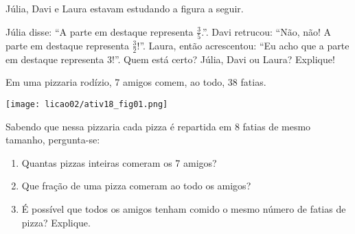 \begin{atividade}{}\label{chap2-ativ18}
\tikzset{x=1mm,y=1mm}

Júlia, Davi e Laura estavam estudando a figura a seguir.
\begin{center}
\end{center}
Júlia disse: ``A parte em destaque representa $\frac{3}{5}$.''. Davi retrucou: ``Não, não! A parte em destaque representa $\frac{3}{2}$!''. Laura, então acrescentou: ``Eu acho que a parte em destaque representa $3$!''. Quem está certo? Júlia, Davi ou Laura? Explique!
\end{atividade}

\begin{atividade}{}\label{chap2-ativ19}

Em uma pizzaria rodízio, 7 amigos comem, ao todo, 38 fatias.

\begin{center}
\texttt{[image: licao02/ativ18\_fig01.png]}
\end{center}


Sabendo que nessa pizzaria cada pizza é repartida em 8 fatias de mesmo tamanho, pergunta-se:
\begin{enumerate}  %
  \item     Quantas pizzas inteiras comeram os 7 amigos?
  \item     Que fração de uma pizza comeram  ao todo os amigos?
  \item     É possível que todos os amigos tenham comido o mesmo número de fatias de pizza? Explique.
\end{enumerate} %
\end{atividade}


